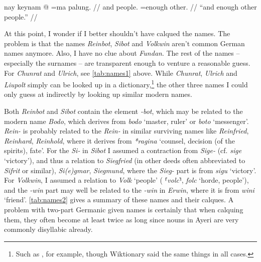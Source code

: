 \documentclass[12pt,paper=a4]{scrartcl}
\newcommand{\fw}[1]{\textit{#1}} %
\newcommand{\norm}[1]{⸢\textit{#1}⸣} %
\begin{document}
	\a \begingl
		\gla nay keynam @ =ma palung. //
		\glb and people.\Top{} =enough other. //
		\glft \enquote{and enough other people.} //
	\endgl
\xe

At this point, I wonder if I better shouldn't have calqued the names. The 
problem is that the names \fw{Reinbot}, \fw{Sibot} and \fw{Volkwin} aren't 
common German names anymore. Also, I have no clue about \fw{Fundan}. The rest of 
the names -- especially the surnames -- are transparent enough to venture a 
reasonable guess. For \fw{Chunrat} and \fw{Ulrich}, see \autoref{tab:names1} 
above. While \fw{Chunrat}, \fw{Ulrich} and \fw{Liupolt} simply can be looked up 
in a dictionary,\footnote{Such as \textcite{duden:vornamen}, for example, though 
Wiktionary said the same things in all cases.} the other three names I could 
only guess at indirectly by looking up similar modern names.

Both \fw{Reinbot} and \fw{Sibot} contain the element \fw{-bot}, which may be 
related to the modern name \fw{Bodo}, which derives from \Os{} \fw{bodo} 
`master, ruler' or \Ohg{} \fw{boto} `messenger'. \fw{Rein-} is probably related 
to the \fw{Rein-} in similar surviving names like \fw{Reinfried}, \fw{Reinhard}, 
\fw{Reinhold}, where it derives from \Gmc{} \fw{*ragina} `counsel, decision (of 
the spirits), fate'. For the \fw{Si-} in \fw{Sibot} I assumed a contraction from 
\fw{Sige-} (cf. \Mhg{} \fw{sige} `victory'), and thus a relation to 
\fw{Siegfried} (in other deeds often abbreviated to \fw{Sifrit} or similar), 
\fw{Si(e)gmar}, \fw{Siegmund}, where the \fw{Sieg-} part is from \Ohg{} 
\fw{sigu} `victory'. For \fw{Volkwin}, I assumed a relation to \Nhg{} \fw{Volk} 
`people' (\Mhg{} \norm{volc}, \Ohg{} \fw{folc} `horde, people'), and the 
\fw{-win} part may well be related to the \fw{-win} in \fw{Erwin}, where it is 
from \Ohg{} \fw{wini} `friend'. \autoref{tab:names2} gives a summary of these 
names and their calques. A problem with two-part Germanic given names is 
certainly that when calquing them, they often become at least twice as long 
since nouns in Ayeri are very commonly disyllabic already.
\end{document}
